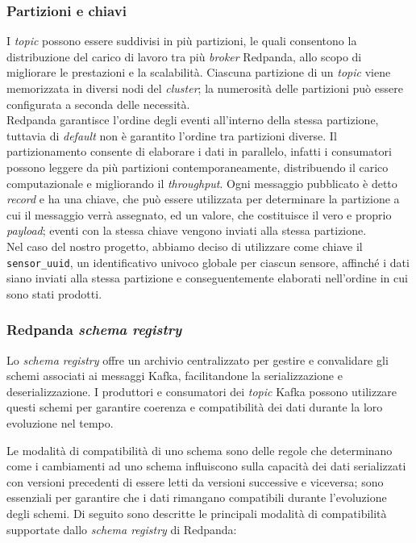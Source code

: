 \subsubsection{Partizioni e chiavi}
I \textit{topic} possono essere suddivisi in più partizioni, le quali consentono la distribuzione del carico di lavoro tra più \textit{broker} Redpanda,
allo scopo di migliorare le prestazioni e la scalabilità. Ciascuna partizione di un \textit{topic} viene memorizzata in diversi nodi del \textit{cluster}; la numerosità
delle partizioni può essere configurata a seconda delle necessità.\\
Redpanda garantisce l'ordine degli eventi all'interno della stessa partizione, tuttavia di \textit{default} non è garantito l'ordine tra partizioni diverse.
Il partizionamento consente di elaborare i dati in parallelo, infatti i consumatori possono leggere da più partizioni contemporaneamente, distribuendo il carico computazionale e migliorando il \textit{throughput}.
Ogni messaggio pubblicato è detto \textit{record} e ha una chiave, che può essere utilizzata per determinare la partizione a cui il messaggio verrà assegnato, ed un valore,
che costituisce il vero e proprio \textit{payload}; eventi con la stessa chiave vengono inviati alla stessa partizione.\\
Nel caso del nostro progetto, abbiamo deciso di utilizzare come chiave il \texttt{sensor\_uuid}, un identificativo univoco globale per ciascun sensore, affinché i dati
siano inviati alla stessa partizione e conseguentemente elaborati nell'ordine in cui sono stati prodotti.

\subsubsection{Redpanda \textit{schema registry}}
Lo \textit{schema registry} offre un archivio centralizzato per gestire e convalidare gli schemi associati ai messaggi Kafka, facilitandone la serializzazione e deserializzazione.
I produttori e consumatori dei \textit{topic} Kafka possono utilizzare questi schemi per garantire coerenza e compatibilità dei dati durante la loro evoluzione nel tempo.

Le modalità di compatibilità di uno schema sono delle regole che determinano come i cambiamenti ad uno schema influiscono sulla capacità dei dati serializzati con
versioni precedenti di essere letti da versioni successive e viceversa; sono essenziali per garantire che i dati rimangano compatibili durante l'evoluzione degli schemi.
Di seguito sono descritte le principali modalità di compatibilità supportate dallo \textit{schema registry} di Redpanda:

